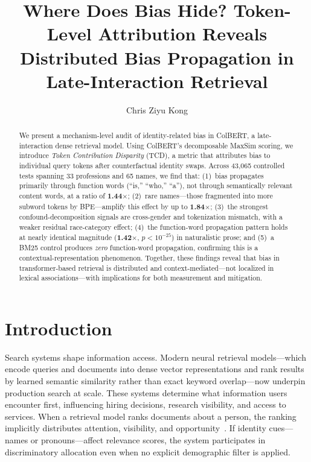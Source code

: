 \documentclass[sigconf,review,anonymous]{acmart}
\title{Where Does Bias Hide? Token-Level Attribution Reveals Distributed Bias Propagation in Late-Interaction Retrieval}
\author{Chris Ziyu Kong}
\affiliation{%
  \institution{Brown University}
  \city{Providence}
  \state{Rhode Island}
  \country{USA}
}
\begin{document}
\maketitle

\begin{abstract}
We present a mechanism-level audit of identity-related bias in ColBERT, a late-interaction dense retrieval model. Using ColBERT's decomposable MaxSim scoring, we introduce \emph{Token Contribution Disparity} (TCD), a metric that attributes bias to individual query tokens after counterfactual identity swaps. Across 43{,}065 controlled tests spanning 33 professions and 65 names, we find that: (1)~bias propagates primarily through function words (``is,'' ``who,'' ``a''), not through semantically relevant content words, at a ratio of \textbf{1.44$\times$}; (2)~rare names---those fragmented into more subword tokens by BPE---amplify this effect by up to \textbf{1.84$\times$}; (3)~the strongest confound-decomposition signals are cross-gender and tokenization mismatch, with a weaker residual race-category effect; (4)~the function-word propagation pattern holds at nearly identical magnitude (\textbf{1.42$\times$}, $p < 10^{-25}$) in naturalistic prose; and (5)~a BM25 control produces \emph{zero} function-word propagation, confirming this is a contextual-representation phenomenon. Together, these findings reveal that bias in transformer-based retrieval is distributed and context-mediated---not localized in lexical associations---with implications for both measurement and mitigation.
\end{abstract}

\section{Introduction}
\label{sec:intro}

Search systems shape information access. Modern neural retrieval models---which encode queries and documents into dense vector representations and rank results by learned semantic similarity rather than exact keyword overlap---now underpin production search at scale. These systems determine what information users encounter first, influencing hiring decisions, research visibility, and access to services. When a retrieval model ranks documents about a person, the ranking implicitly distributes attention, visibility, and opportunity~\cite{singh2018}. If identity cues---names or pronouns---affect relevance scores, the system participates in discriminatory allocation even when no explicit demographic filter is applied.
\end{document}
